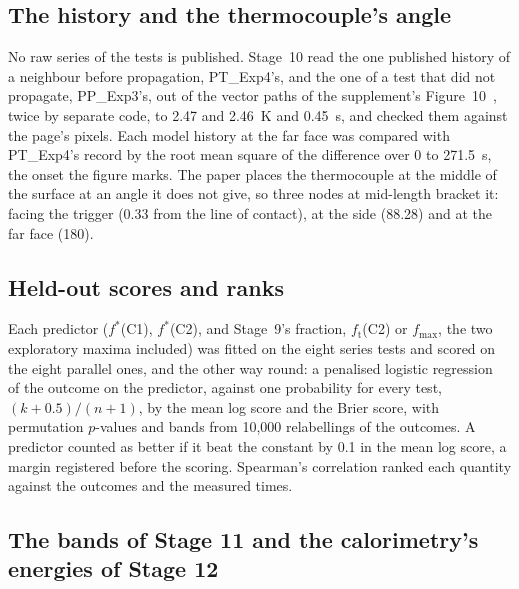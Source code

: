 \documentclass[preprint,12pt]{elsarticle}
\newcommand{\fs}{f^{*}}
\newcommand{\ft}{f_{\mathrm{t}}}
\newcommand{\fmax}{f_{\mathrm{max}}}
\begin{document}
\subsection{The history and the thermocouple's angle}
\label{sec:history}

No raw series of the tests is published. Stage~10 read the one published history of a neighbour before propagation, PT\_Exp4's, and the one of a test that did not propagate, PP\_Exp3's, out of the vector paths of the supplement's Figure~10~\cite{fransson2024exploring}, twice by separate code, to 2.47 and 2.46~K and 0.45~s, and checked them against the page's pixels. Each model history at the far face was compared with PT\_Exp4's record by the root mean square of the difference over 0 to 271.5~s, the onset the figure marks. The paper places the thermocouple at the middle of the surface at an angle it does not give, so three nodes at mid-length bracket it: facing the trigger (0.33\textdegree{} from the line of contact), at the side (88.28\textdegree) and at the far face (180\textdegree).

\subsection{Held-out scores and ranks}
\label{sec:heldout}

Each predictor ($\fs$(C1), $\fs$(C2), and Stage~9's fraction, $\ft$(C2) or $\fmax$, the two exploratory maxima included) was fitted on the eight series tests and scored on the eight parallel ones, and the other way round: a penalised logistic regression~\cite{firth1993bias} of the outcome on the predictor, against one probability for every test, $(k+0.5)/(n+1)$, by the mean log score and the Brier score, with permutation $p$-values and bands from 10,000 relabellings of the outcomes. A predictor counted as better if it beat the constant by 0.1 in the mean log score, a margin registered before the scoring. Spearman's correlation ranked each quantity against the outcomes and the measured times.

\subsection{The bands of Stage 11 and the calorimetry's energies of Stage 12}
\label{sec:draws}
\end{document}
